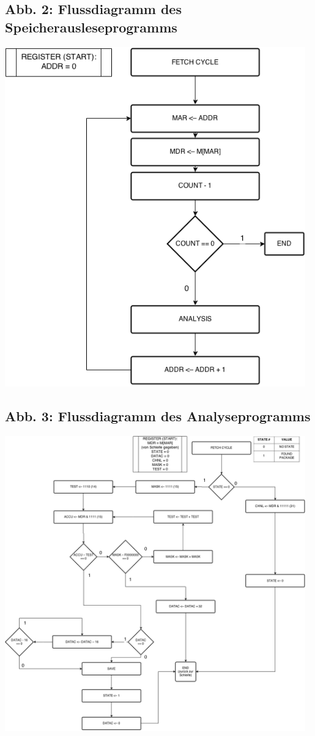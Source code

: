 \documentclass[12pt,titlepage]{article}
\begin{document}
\subsection{Abb. 2: Flussdiagramm des Speicherausleseprogramms}
\includegraphics[width=13cm]{readFromMemory.png}

\subsection{Abb. 3: Flussdiagramm des Analyseprogramms}
\includegraphics[width=13cm]{analyseData.png}
\end{document}
